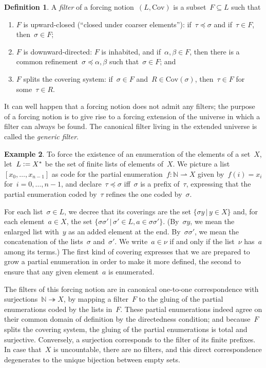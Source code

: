 \documentclass[com,11pt,crcready]{iosart2x}
\theoremstyle{definition}
\newtheorem{definition}{Definition}[section]
\newtheorem{example}[definition]{Example}
\theoremstyle{plain}
\theoremstyle{remark}
\newcommand{\?}{\,{:}\,}
\newcommand{\NN}{\mathbb{N}}
\newcommand{\defeq}{\vcentcolon=}
\newcommand{\Cov}{\mathrm{Cov}}
\renewcommand{\_}{\mathpunct{.}\,}
\begin{document}
\begin{definition}A \emph{filter} of a forcing notion~$(L,\mathrm{Cov})$
is a subset~$F \subseteq L$ such that
\begin{enumerate}
\item $F$ is upward-closed (``closed under coarser elements''): if~$\tau \preccurlyeq \sigma$ and if~$\tau \in F$,
then~$\sigma \in F$;
\item $F$ is downward-directed: $F$ is inhabited, and if~$\alpha,\beta \in F$,
then there is a common refinement~$\sigma \preccurlyeq \alpha,\beta$ such
that~$\sigma \in F$; and
\item $F$ splits the covering system: if~$\sigma \in F$ and~$R \in
\Cov(\sigma)$, then~$\tau \in F$ for some~$\tau \in R$.
\end{enumerate}
\end{definition}

It can well happen that a forcing notion does not admit any filters; the
purpose of a forcing notion is to give rise to a forcing extension of the
universe in which a filter can always be found. The canonical filter living in
the extended universe is called the \emph{generic filter}.

\begin{example}\label{ex:notion-enum}To force the existence of an enumeration
of the elements of a set~$X$, let~$L \defeq X^*$ be the set of finite lists
of elements of~$X$. We picture a list~$[x_0,\ldots,x_{n-1}]$ as code for the
partial enumeration~$f : \NN \rightharpoonup X$ given by~$f(i) = x_i$
for~$i=0,\ldots,n-1$, and declare~$\tau \preccurlyeq \sigma$ iff~$\sigma$ is a prefix
of~$\tau$, expressing that the partial enumeration coded by~$\tau$ refines the
one coded by~$\sigma$.

For each list~$\sigma \in L$, we decree that its coverings are the set
$\{ \sigma y \,|\, y \in X \}$
and, for each element~$a \in X$, the set
$\{ \sigma \sigma' \,|\, \sigma' \in L, a \in \sigma \sigma'
\}$. (By~$\sigma y$, we mean the enlarged list with~$y$ as an
added element at the end. By~$\sigma \sigma'$, we mean the concatenation
of the lists~$\sigma$ and~$\sigma'$. We write~$a \in \nu$ if and only if the
list~$\nu$ has~$a$ among its terms.)
The first kind of covering expresses that we are prepared to grow a partial
enumeration in order to make it more defined, the second to ensure
that any given element~$a$ is enumerated.

The filters of this forcing notion
are in canonical one-to-one correspondence with
surjections~$\NN \twoheadrightarrow X$, by mapping a filter~$F$ to the gluing
of the partial enumerations coded by the lists in~$F$. These partial
enumerations indeed agree on their common domain of definition by the
directedness condition; and because~$F$ splits the covering system, the gluing
of the partial enumerations is total and surjective. Conversely, a surjection corresponds to the filter of
its finite prefixes. In case that~$X$ is uncountable, there are no filters, and
this direct correspondence degenerates to the unique bijection between
empty sets.
\end{example}
\end{document}
